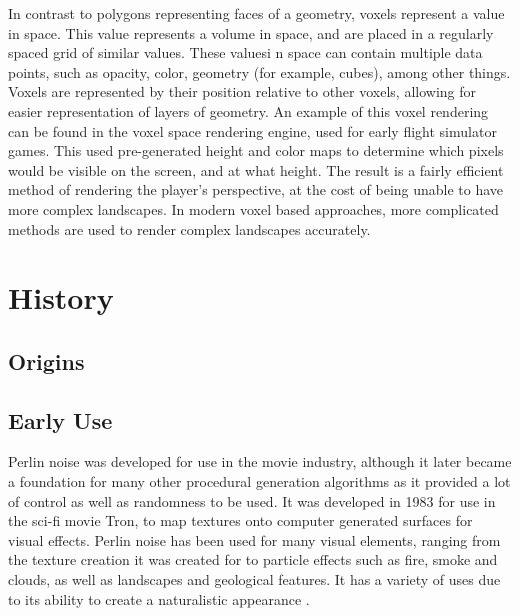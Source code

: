 \documentclass[10pt]{report}
\begin{document}
		In contrast to polygons representing faces of a geometry, voxels represent a value in space. This value represents a volume in space, and are placed in a regularly spaced grid of similar values. These valuesi n space can contain multiple data points, such as opacity, color, geometry (for example, cubes), among other things. Voxels are represented by their position relative to other voxels, allowing for easier representation of layers of geometry. An example of this voxel rendering can be found in the voxel space rendering engine, used for early flight simulator games. This used pre-generated height and color maps to determine which pixels would be visible on the screen, and at what height. The result is a fairly efficient method of rendering the player's perspective, at the cost of being unable to have more complex landscapes. In modern voxel based approaches, more complicated methods are used to render complex landscapes accurately.
		
	\vspace{10pt}
	\let\clearpage\relax
	\chapter{History}
	
		\section{Origins}
	
	
		\section{Early Use}
		
		Perlin noise was developed for use in the movie industry, although it later became a foundation for many other procedural generation algorithms as it provided a lot of control as well as randomness to be used. It was developed in 1983 for use in the sci-fi movie Tron, to map textures onto computer generated surfaces for visual effects. Perlin noise has been used for many visual elements, ranging from the texture creation it was created for to particle effects such as fire, smoke and clouds, as well as landscapes and geological features. It has a variety of uses due to its ability to create a naturalistic appearance \cite{10.1145/325165.325247}.
\end{document}
